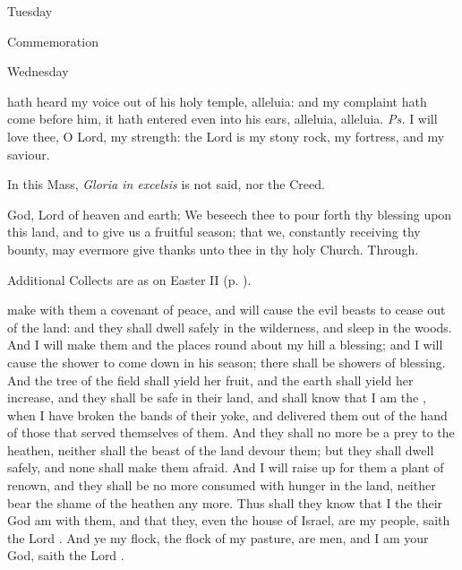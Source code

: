\begin{inhead}
    Tuesday\par
 Commemoration
\end{inhead}

\begin{inhead}
    Wednesday
\end{inhead}
\introit
{} hath heard my voice out of his holy temple, alleluia: and my complaint hath come before him, it hath entered even into his ears, alleluia, alleluia. \textit{Ps.} I will love thee, O Lord, my strength: the Lord is my stony rock, my fortress, and my saviour.
\begin{rubric}
    In this Mass, \emph{Gloria in excelsis} is not said, nor the Creed.
\end{rubric}

\collect
{} God, Lord of heaven and earth; We beseech thee to pour forth thy blessing upon this land, and to give us a fruitful season; that we, constantly receiving thy bounty, may evermore give thanks unto thee in thy holy Church. Through.
\begin{rubric}
    Additional Collects are as on Easter II (p. \pageref{EasterII}).
\end{rubric}
 make with them a covenant of peace, and will cause the evil beasts to cease out of the land: and they shall dwell safely in the wilderness, and sleep in the woods. And I will make them and the places round about my hill a blessing; and I will cause the shower to come down in his season; there shall be showers of blessing. And the tree of the field shall yield her fruit, and the earth shall yield her increase, and they shall be safe in their land, and shall know that I am the , when I have broken the bands of their yoke, and delivered them out of the hand of those that served themselves of them. And they shall no more be a prey to the heathen, neither shall the beast of the land devour them; but they shall dwell safely, and none shall make them afraid. And I will raise up for them a plant of renown, and they shall be no more consumed with hunger in the land, neither bear the shame of the heathen any more. Thus shall they know that I the  their God am with them, and that they, even the house of Israel, are my people, saith the Lord . And ye my flock, the flock of my pasture, are men, and I am your God, saith the Lord .

